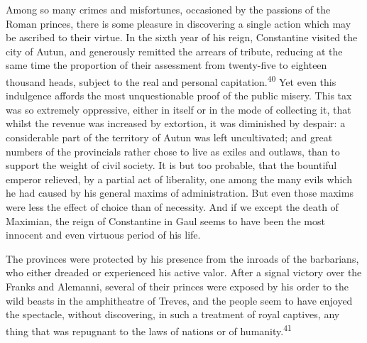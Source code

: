 


Among so many crimes and misfortunes, occasioned by the passions
of the Roman princes, there is some pleasure in discovering a
single action which may be ascribed to their virtue. In the sixth
year of his reign, Constantine visited the city of Autun, and
generously remitted the arrears of tribute, reducing at the same
time the proportion of their assessment from twenty-five to
eighteen thousand heads, subject to the real and personal
capitation.\textsuperscript{40} Yet even this indulgence affords the most
unquestionable proof of the public misery. This tax was so
extremely oppressive, either in itself or in the mode of
collecting it, that whilst the revenue was increased by
extortion, it was diminished by despair: a considerable part of
the territory of Autun was left uncultivated; and great numbers
of the provincials rather chose to live as exiles and outlaws,
than to support the weight of civil society. It is but too
probable, that the bountiful emperor relieved, by a partial act
of liberality, one among the many evils which he had caused by
his general maxims of administration. But even those maxims were
less the effect of choice than of necessity. And if we except the
death of Maximian, the reign of Constantine in Gaul seems to have
been the most innocent and even virtuous period of his life.

The provinces were protected by his presence from the inroads of
the barbarians, who either dreaded or experienced his active
valor. After a signal victory over the Franks and Alemanni,
several of their princes were exposed by his order to the wild
beasts in the amphitheatre of Treves, and the people seem to have
enjoyed the spectacle, without discovering, in such a treatment
of royal captives, any thing that was repugnant to the laws of
nations or of humanity.\textsuperscript{41}

